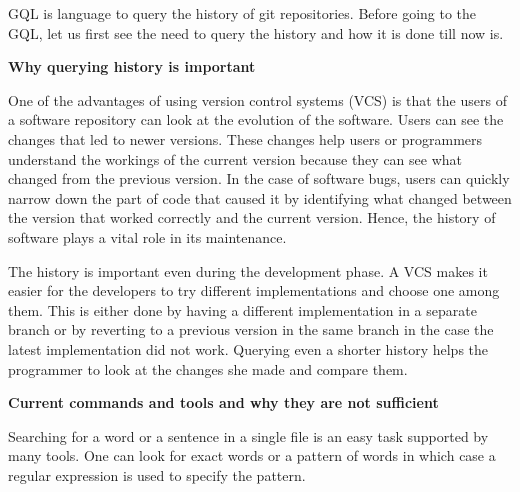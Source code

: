 
GQL is language to query the history of git repositories. Before going to the GQL, let us first see the need to query the history and how it is done till now is.

\textbf{Why querying history is important}

One of the advantages of using version control systems (VCS) is that the users of a software repository can look at the evolution of the software. Users can see the changes that led to newer versions. These changes help users or programmers understand the workings of the current version because they can see what changed from the previous version. In the case of software bugs, users can quickly narrow down the part of code that caused it by identifying what changed between the version that worked correctly and the current version. Hence, the history of software plays a vital role in its maintenance. 


The history is important even during the development phase. A VCS makes it easier for the developers to try different implementations and choose one among them. This is either done by having a different implementation in a separate branch or by reverting to a previous version in the same branch in the case the latest implementation did not work. Querying even a shorter history helps the programmer to look at the changes she made and compare them.

\textbf{Current commands and tools and why they are not sufficient}

Searching for a word or a sentence in a single file is an easy task supported by many tools.%
One can look for exact words or a pattern of words in which case a regular expression is used to specify the pattern. 

